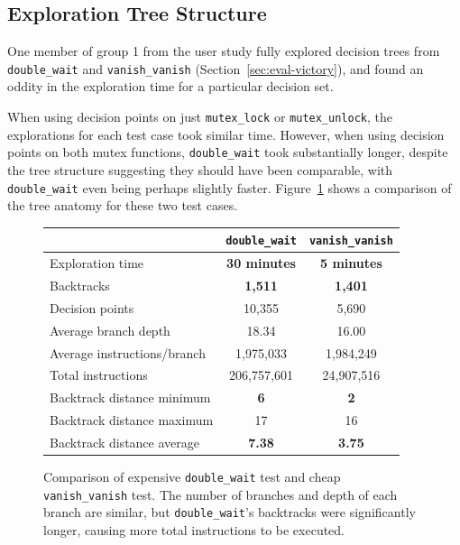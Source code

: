 \subsection{Exploration Tree Structure}
\label{sec:future-nadim}

One member of group 1 from the user study fully explored decision trees from \texttt{double\_wait} and \texttt{vanish\_vanish} (Section~\ref{sec:eval-victory}), and found an oddity in the exploration time for a particular decision set.

When using decision points on just \texttt{mutex\_lock} or \texttt{mutex\_unlock}, the explorations for each test case took similar time. However, when using decision points on both mutex functions, \texttt{double\_wait} took substantially longer, despite the tree structure suggesting they should have been comparable, with \texttt{double\_wait} even being perhaps slightly faster. Figure~\ref{fig:nadim-stats} shows a comparison of the tree anatomy for these two test cases.

\begin{figure}[h]
	\small
	\centering
	\begin{tabular}{|l||c|c|}
		\hline
		& \texttt{double\_wait} & \texttt{vanish\_vanish} \\
		\hline\hline
		Exploration time & {\bf 30 minutes} & {\bf 5 minutes} \\
		\hline
		Backtracks & {\bf 1,511} & {\bf 1,401} \\
		\hline
		Decision points & 10,355 & 5,690 \\
		\hline
		Average branch depth & 18.34 & 16.00 \\
		\hline
		Average instructions/branch& 1,975,033 & 1,984,249 \\
		\hline
		Total instructions & 206,757,601 & 24,907,516 \\
		\hline
		Backtrack distance minimum & {\bf 6} & {\bf 2} \\
		\hline
		Backtrack distance maximum & 17 & 16 \\
		\hline
		Backtrack distance average & {\bf 7.38}  & {\bf 3.75} \\
		\hline
	\end{tabular}
	\caption{Comparison of expensive \texttt{double\_wait} test and cheap \texttt{vanish\_vanish} test. The number of branches and depth of each branch are similar, but \texttt{double\_wait}'s backtracks were significantly longer, causing more total instructions to be executed.}
	\label{fig:nadim-stats}
\end{figure}

